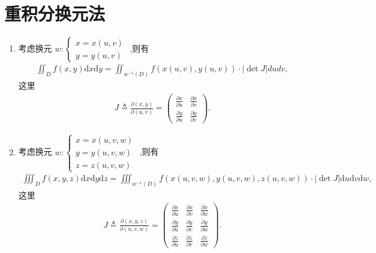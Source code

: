 \documentclass[../../main.tex]{subfiles}%
\begin{document}
\section{重积分换元法}

\begin{theorem}[重积分换元法]\label{theorem:重积分换元法}
\begin{enumerate}
\item 考虑换元 $w:\begin{cases}x = x(u,v)\\y = y(u,v)\end{cases}$ ,则有
\begin{align*}
\iint_D f(x,y) \mathrm{d}x\mathrm{d}y= \iint_{w^{-1}(D)} f(x(u,v),y(u,v)) \cdot |\det J| dudv,
\end{align*}
这里
\begin{align*}
J \triangleq \frac{\partial(x,y)}{\partial(u,v)} = {\textstyle \begin{pmatrix}\frac{\partial x}{\partial u}&\frac{\partial x}{\partial v}\\\frac{\partial y}{\partial u}&\frac{\partial y}{\partial v}\end{pmatrix}}.
\end{align*}
\item 考虑换元 $w:\begin{cases}x = x(u,v,w)\\y = y(u,v,w)\\z = z(u,v,w)\end{cases}$ ,则有
\begin{align*}
\iiint_D f(x,y,z) \mathrm{d}x\mathrm{d}y\mathrm{d}z = \iiint_{w^{-1}(D)} f(x(u,v,w),y(u,v,w),z(u,v,w)) \cdot |\det J| \mathrm{d}u\mathrm{d}v\mathrm{d}w,
\end{align*}
这里
\begin{align*}
J \triangleq \frac{\partial(x,y,z)}{\partial(u,v,w)} = \begin{pmatrix}\frac{\partial x}{\partial u}&\frac{\partial x}{\partial v}&\frac{\partial x}{\partial w}\\\frac{\partial y}{\partial u}&\frac{\partial y}{\partial v}&\frac{\partial y}{\partial w}\\\frac{\partial z}{\partial u}&\frac{\partial z}{\partial v}&\frac{\partial z}{\partial w}\end{pmatrix}.
\end{align*}
\end{enumerate}
\end{theorem}
\end{document}
